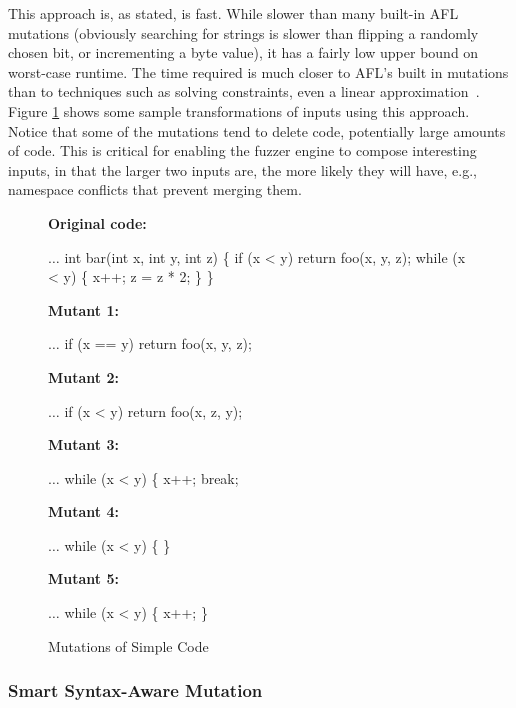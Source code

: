 This approach is, as stated, is fast.  While slower than many built-in
AFL mutations (obviously searching for strings is slower than flipping
a randomly chosen bit, or incrementing a byte value), it has a fairly
low upper bound on worst-case runtime.  The time required is much
closer to AFL's built in mutations than to techniques such as
solving constraints, even a linear
approximation~\cite{Eclipser}.  Figure \ref{fig:fopexample} shows some
sample transformations of inputs using this approach.  Notice that
some of the mutations tend to delete code, potentially large amounts
of code.  This is critical for enabling the fuzzer engine to compose
interesting inputs, in that the larger two inputs are, the
more likely they will have, e.g., namespace conflicts that prevent
merging them.

\begin{figure}
  \raggedright
  {\scriptsize
    {\bf Original code:}
\begin{code}
$\ldots$      
 int bar(int x, int y, int z) \{
   if (x < y)
      return foo(x, y, z);
   while (x < y) \{
      x++;
      z = z * 2;
   \}
\}
\end{code}
   {\bf Mutant 1:}
\begin{code}
$\ldots$      
   if (x == y)
      return foo(x, y, z);
\end{code}
   {\bf Mutant 2:}
\begin{code}
$\ldots$      
   if (x < y)
      return foo(x, z, y);
\end{code}
   {\bf Mutant 3:}
\begin{code}
$\ldots$      
   while (x < y) \{
      x++;
      break;
    \end{code}
   {\bf Mutant 4:}
\begin{code}
$\ldots$      
   while (x < y) \{
   \}
 \end{code}
 {\bf Mutant 5:}
\begin{code}
$\ldots$      
   while (x < y) \{
     x++;
   \}
 \end{code}

}
\caption{Mutations of  Simple Code}
\label{fig:fopexample}
\end{figure}

\subsubsection{Smart Syntax-Aware Mutation}

